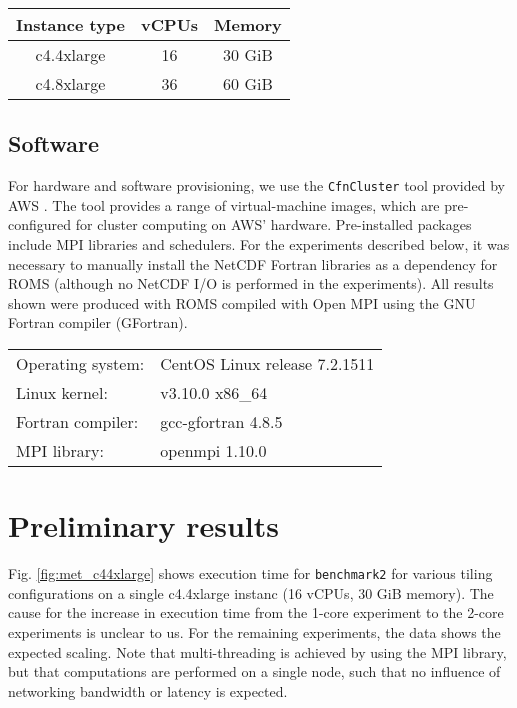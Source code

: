 \documentclass[12pt,a4paper]{article}
\begin{document}
\begin{center}
\begin{tabular}{ c c c }
 Instance type & vCPUs & Memory \\
 \hline
	c4.4xlarge & 16 & 30 GiB \\
	c4.8xlarge & 36 & 60 GiB\\
\end{tabular}
\end{center}


\subsection{Software}

For hardware and software provisioning, we use the \verb|CfnCluster| tool provided by AWS \citep{web:awscfncluster}. The tool provides a range of virtual-machine images, which are pre-configured for cluster computing on AWS' hardware. Pre-installed packages include MPI libraries and schedulers. For the experiments described below, it was necessary to manually install the NetCDF Fortran libraries as a dependency for ROMS (although no NetCDF I/O is performed in the experiments).
All results shown were produced with ROMS compiled with Open MPI using the GNU Fortran compiler (GFortran).

\begin{center}
	\begin{tabular}{ l l }
		Operating system: & CentOS Linux release 7.2.1511 \\
		Linux kernel: & v3.10.0 x86\_64 \\
		Fortran compiler: & gcc-gfortran 4.8.5 \\
		MPI library: &  openmpi 1.10.0 \\
	\end{tabular}
\end{center}


\section{Preliminary results}


Fig. \ref{fig:met_c44xlarge} shows execution time for \verb|benchmark2| for various tiling configurations on a single c4.4xlarge instanc (16	vCPUs, 30 GiB memory).  The cause for the increase in execution time from the 1-core experiment to the 2-core experiments is unclear to us. For the remaining experiments, the data shows the expected scaling. Note that multi-threading is achieved by using the MPI library, but that computations are performed on a single node, such that no influence of networking bandwidth or latency is expected.
\end{document}
